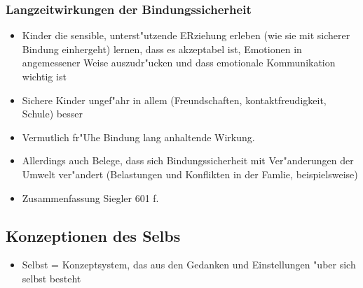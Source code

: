 \subsubsection{Langzeitwirkungen der Bindungssicherheit}
\begin{itemize}
	\item
		Kinder die sensible, unterst"utzende ERziehung erleben (wie sie mit sicherer Bindung einhergeht) lernen, dass es akzeptabel ist, Emotionen in angemessener Weise auszudr"ucken und dass emotionale Kommunikation wichtig ist
	\item
		Sichere Kinder ungef"ahr in allem (Freundschaften, kontaktfreudigkeit, Schule) besser
	\item
		Vermutlich fr"Uhe Bindung lang anhaltende Wirkung.
	\item
		Allerdings auch Belege, dass sich Bindungssicherheit mit Ver"anderungen der Umwelt ver"andert (Belastungen und Konflikten in der Famlie, beispielsweise)
	\item
		Zusammenfassung Siegler 601 f.
\end{itemize}


\subsection{Konzeptionen des Selbs}
\begin{itemize}
	\item
		Selbst = Konzeptsystem, das aus den Gedanken und Einstellungen "uber sich selbst besteht
\end{itemize}
